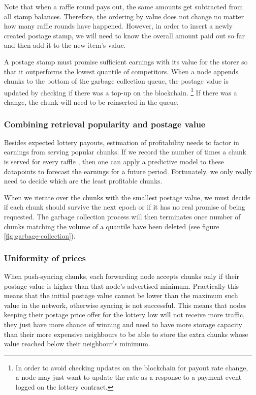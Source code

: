 Note that when a raffle round pays out, the same amounts get subtracted from all stamp balances. Therefore, the ordering by value does not change no matter how many raffle rounds have happened. However, in order to insert a newly created postage stamp, we will need to know the overall amount paid out so far and then add it to the new item's value.

A postage stamp must promise sufficient earnings with its value for the storer so that it outperforms the lowest quantile of competitors. When a node appends chunks to the bottom of the garbage collection queue, the postage value is updated by checking if there was a top-up on the blockchain.%
%
\footnote{In order to avoid checking updates on the blockchain for payout rate change, a node may just want to update the rate as a response to a payment event logged on the lottery contract.}
%
If there was a change, the chunk will need to be reinserted in the queue. 

\subsubsection{Combining retrieval popularity and postage value}

Besides expected lottery payouts, estimation of profitability needs to factor in earnings from serving popular chunks. If we record the number of times a chunk is served for every raffle , then one can apply a predictive model to these datapoints to forecast the earnings for a future period. Fortunately, we only really need to decide which are the least profitable chunks. 



When we iterate over the chunks with the smallest postage value, we must decide if each chunk should survive the next epoch or if it has no real promise of being requested. The garbage collection process will then terminates once number of chunks matching the volume of a quantile have been deleted (see figure \ref{fig:garbage-collection}).

\subsubsection{Uniformity of prices} 

When push-syncing chunks, each forwarding node accepts chunks only if their postage value is higher than that node's advertised minimum. Practically this means that the initial postage value cannot be lower than the maximum such value in the network, otherwise syncing is not successful. This means that nodes keeping their postage price offer for the lottery low will not receive more traffic, they just have more chance of winning and need to have more storage capacity than their more expensive neighbours to be able to store the extra chunks whose value reached below their neighbour's minimum.

